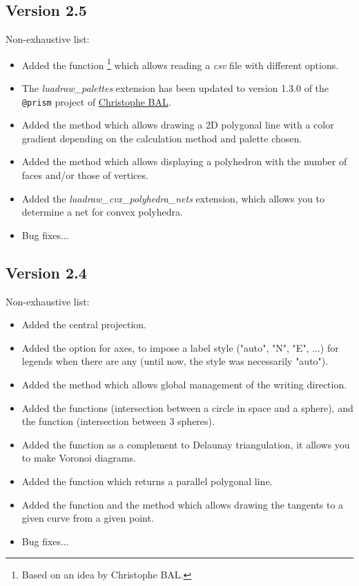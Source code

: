 \subsection{Version 2.5}
Non-exhaustive list:
\begin{itemize}
    \item Added the function \footnote{Based on an idea by Christophe BAL.} which allows reading a \emph{csv} file with different options.
    \item The \emph{luadraw\_palettes} extension has been updated to version 1.3.0 of the \verb|@prism| project of \href{https://github.com/projetmbc/for-writing/tree/main/@prism}{Christophe BAL}.
    \item Added the method  which allows drawing a 2D polygonal line with a color gradient depending on the calculation method and palette chosen.
    \item Added the  method which allows displaying a polyhedron with the number of faces and/or those of vertices.
    \item Added the \emph{luadraw\_cvx\_polyhedra\_nets} extension, which allows you to determine a net for convex polyhedra.
    \item Bug fixes...
\end{itemize}

\subsection{Version 2.4}
Non-exhaustive list:
\begin{itemize}
    \item Added the central projection.
    \item Added the  option for axes, to impose a label style ("auto", "N", "E", ...) for legends when there are any (until now, the style was necessarily "auto").
    \item Added the  method which allows global management of the writing direction.
    \item Added the functions  (intersection between a circle in space and a sphere), and the function  (intersection between 3 spheres).
    \item Added the function  as a complement to Delaunay triangulation, it allows you to make Voronoi diagrams.
    \item Added the function  which returns a parallel polygonal line.
    \item Added the function  and the method  which allows drawing the tangents to a given curve from a given point.
    \item Bug fixes...
\end{itemize}

